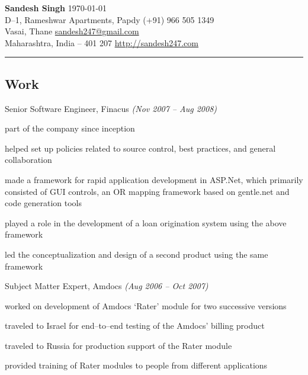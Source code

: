 \documentclass[a4paper,10pt,final]{article}
\newcommand{\resumetitle}[1]{%
	\subsection*{%
		\hspace{-5pt}\large#1%
	}%
	
	\medskip%
}%
\newcommand{\resumedescheader}[1]{%
	\resumetitle{#1}
}%
\newenvironment{resumedescription}{%
	\begin{basedescript}{\desclabelstyle{\nextlinelabel}\desclabelwidth{0.15\linewidth}}{%
		\renewcommand{\makelabel}[1]{\textsl{##1}}%
	}%
	}{%
	\end{basedescript}%
}
\begin{document}
\thispagestyle{empty}
\begin{center}
    \hspace{-10pt} \huge\textbf{Sandesh Singh} \hfill \normalsize \today \\
    \medskip D--1, Rameshwar Apartments, Papdy \hfill (+91) 966 505 1349 \\
    Vasai, Thane \hfill \href{mailto:sandesh247@gmail.com}{sandesh247@gmail.com} \\
    Maharashtra, India -- 401 207 \hfill  \url{http://sandesh247.com}          \\
  \rule[2pt]{0.99\linewidth}{.1pt}
\end{center}
\vspace{-10pt}
\resumedescheader{Work}
	\begin{resumedescription}
		\item[Senior Software Engineer, Finacus \hfill \emph {(Nov 2007 -- Aug 2008)}]
		\begin{itemize*}
			\item part of the company since inception
			\item helped set up policies related to source control, best practices, and general collaboration
			\item made a framework for rapid application development in ASP.Net, which primarily consisted of GUI controls, an OR mapping framework based on gentle.net and code generation tools
			\item played a role in the development of a loan origination system using the above framework
			\item led the conceptualization and design of a second product using the same framework
		\end{itemize*}
	\end{resumedescription}

	\begin{resumedescription}
		\item[Subject Matter Expert, Amdocs \hfill \emph {(Aug 2006 -- Oct 2007)}]
		\begin{itemize*}
			\item worked on development of Amdocs `Rater' module for two successive versions
			\item traveled to Israel for end--to--end testing of the Amdocs' billing product
			\item traveled to Russia for production support of the Rater module
			\item provided training of Rater modules to people from different applications
		\end{itemize*}
	\end{resumedescription}
\end{document}
